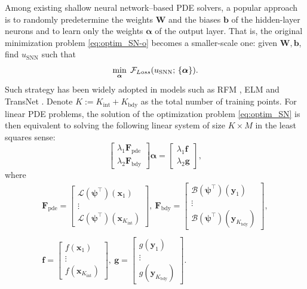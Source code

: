 \documentclass{article}
\newcommand{\bb}{\mathbf{b}}
\newcommand{\bff}{\mathbf{f}}
\newcommand{\bg}{\mathbf{g}}
\newcommand{\bx}{\mathbf{x}}
\newcommand{\bF}{\mathbf{F}}
\newcommand{\bW}{\mathbf{W}}
\newcommand{\cB}{\mathcal{B}}
\newcommand{\cL}{\mathcal{L}}
\newcommand{\valpha}{{\boldsymbol{\alpha}}}
\newcommand{\vpsi}{\boldsymbol{\psi}}
\begin{document}
Among existing shallow neural network–based PDE solvers, a popular approach is to randomly predetermine the weights $\bW$ and the biases $\bb$ of the hidden-layer neurons and to learn only the weights $\valpha$ of the output layer. That is, the original minimization problem \eqref{eq:optim_SN-o} becomes a smaller-scale one: given ${\bW,\bb}$, find $u_{\mathrm{SNN}}$ such that
\begin{equation}\label{eq:optim_SN}
\min_{\valpha}\; {\cal F}_{Loss}(u_{\mathrm{SNN}};\,\{\valpha\}).
\end{equation}
Such strategy has been widely adopted in models such as RFM \cite{RFM}, ELM \cite{ELM} and TransNet \cite{TransNet}. Denote $K := K_{\mathrm{int}} + K_{\mathrm{bdy}}$ as the total number of training points. 
For linear PDE problems, the solution of the optimization problem \eqref{eq:optim_SN} is then equivalent to solving the following linear system of size $K\times M$ in the least squares sense:
\begin{equation}\label{eq:ls}
    \begin{bmatrix}
        \lambda_1\bF_{\mathrm{pde}}   \\
        \lambda_2\bF_{\mathrm{bdy}}
    \end{bmatrix}
    \valpha = \begin{bmatrix}
        \lambda_1 \bff \\ 
        \lambda_2 \bg
    \end{bmatrix},
\end{equation}
where 
\begin{equation}\label{eq:FFfg}
\begin{array}{c}
\bF_{\mathrm{pde}} = \begin{bmatrix}
\cL(\vpsi^\top)(\bx_1) \\
\vdots \\
\cL(\vpsi^\top)(\bx_{K_{\text{int}}}) 
\end{bmatrix}, ~
\bF_{\mathrm{bdy}} = \begin{bmatrix}
\cB(\vpsi^\top)(\mathbf{y}_1) \\
\vdots \\
\cB(\vpsi^\top)(\mathbf{y}_{K_{\text{bdy}}}) 
\end{bmatrix},  \\ \\
\bff = \begin{bmatrix}
f(\bx_1) \\
\vdots \\
f(\bx_{K_{\text{int}}}) 
\end{bmatrix}, ~
\bg = \begin{bmatrix}
g(\mathbf{y}_1) \\
\vdots \\
g(\mathbf{y}_{K_{\text{bdy}}}) 
\end{bmatrix}.
\end{array}
\end{equation}
\end{document}
